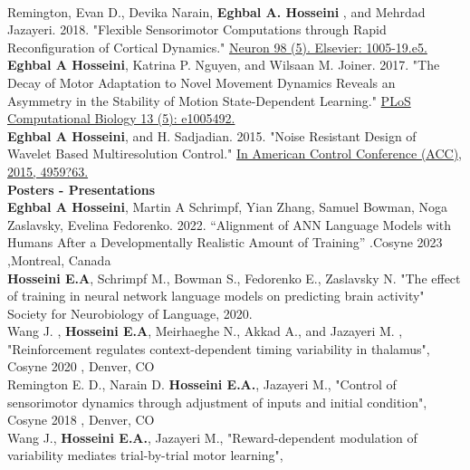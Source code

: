 \documentclass[margin, 10pt]{res}
\begin{document}
\begin{resume}
\vspace{2.5mm} \\
Remington, Evan D., Devika Narain, {\bf Eghbal A. Hosseini }, and Mehrdad Jazayeri. 2018. "Flexible Sensorimotor Computations through Rapid Reconfiguration of Cortical Dynamics." \href{https://www.cell.com/neuron/abstract/S0896-6273(18)30418-5}{ Neuron 98 (5). Elsevier: 1005-19.e5.}  \ 
\vspace{2.5mm} \\
\textbf{Eghbal A Hosseini}, Katrina P. Nguyen, and Wilsaan M. Joiner. 2017. "The Decay of Motor Adaptation to Novel Movement Dynamics Reveals an Asymmetry in the Stability of Motion State-Dependent Learning." \href{https://doi.org/10.1371/journal.pcbi.1005492} { PLoS Computational Biology 13 (5): e1005492.} \
\vspace{2.5mm} \\
\textbf{Eghbal A Hosseini}, and H. Sadjadian. 2015. "Noise Resistant Design of Wavelet Based Multiresolution Control."  \href{http://ieeexplore.ieee.org/document/7172111/} {In American Control Conference (ACC), 2015, 4959?63.}  \
\vspace{5mm} \\
\textbf{Posters - Presentations} \
\vspace{2mm} \\
\textbf{Eghbal A Hosseini}, Martin A Schrimpf, Yian Zhang, Samuel Bowman, Noga Zaslavsky, Evelina Fedorenko. 2022. “Alignment of ANN Language Models with Humans After a Developmentally Realistic Amount of Training” .Cosyne 2023 ,Montreal, Canada \vspace{2.5mm} \\
 {\bf  Hosseini E.A}, Schrimpf M., Bowman S., Fedorenko E., Zaslavsky N. "The effect of training in neural network language models on predicting brain activity" Society for Neurobiology of Language,  2020. \vspace{2.5mm} \\
 Wang J. , {\bf  Hosseini E.A},  Meirhaeghe N., Akkad A., and  Jazayeri M. , "Reinforcement regulates context-dependent timing variability in thalamus", Cosyne 2020 , Denver, CO \vspace{2.5mm} \\
Remington E. D., Narain D. { \bf Hosseini E.A.}, Jazayeri M., "Control of sensorimotor dynamics through adjustment of inputs and initial condition",
 Cosyne 2018 , Denver, CO \vspace{2.5mm} \\
 Wang J., { \bf Hosseini E.A.}, Jazayeri M., "Reward-dependent modulation of variability mediates trial-by-trial motor learning",

\end{resume}
\end{document}
